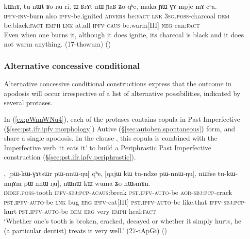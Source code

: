 \begin{exe}
\ex \label{ex:chWwGnWBlW.kWnA}
  kɯnɤ, tu-nɯt ʁo ŋu ri, ɯ-ʁrɤt nɯ ɲaʁ ʑo qʰe, maka ɲɯ-ɣɤ-mpje mɤ-cʰa. \\
  \textsc{ipfv}-\textsc{inv}-burn also \textsc{ipfv}-be.ignited \textsc{advers} be:\textsc{fact} \textsc{lnk}
\textsc{3sg}.\textsc{poss}-charcoal \textsc{dem}  be.black:\textsc{fact} \textsc{emph} \textsc{lnk} at.all \textsc{ipfv}-\textsc{caus}-be.warm[III] \textsc{neg}-can:\textsc{fact} \\
 \glt Even when one burns it, although it does ignite, its charcoal is black and it does not warm anything. (17-thowum)
()
\end{exe}
 
 \subsubsection{Alternative concessive conditional} \label{sec:alt.concessive.conditional}
Alternative concessive conditional constructions express that the outcome in apodosis will occur irrespective of a list of alternative possibilities, indicated by several protases. 


 In (\ref{ex:pWnnWNu4}), each of the protases contains copula  in Past Imperfective (§\ref{sec:pst.ifr.ipfv.morphology}) Autive (§\ref{sec:autoben.spontaneous}) form, and share a single apodosis. In the clause , this copula is combined with the Imperfective verb  `it eats it' to build a Periphrastic Past Imperfective construction (§\ref{sec:pst.ifr.ipfv.periphrastic}).

\begin{exe}
\ex  \label{ex:pWnnWNu4}
, [pɯ-kɯ-ɣɤtsɯr pɯ-nnɯ-ŋu] qʰe, [qajɯ kɯ tu-ndze pɯ-nnɯ-ŋu], nɯfse tu-kɯ-mŋɤm pɯ-nnɯ-ŋu], nɯnɯ kɯ wuma ʑo nɯsmɤn. \\
\textsc{indef}.\textsc{poss}-tooth \textsc{ipfv}-\textsc{sbj}:\textsc{pcp}-\textsc{acaus}:break \textsc{pst}.\textsc{ipfv}-\textsc{auto}-be
\textsc{aor}-\textsc{sbj}:\textsc{pcp}-crack \textsc{pst}.\textsc{ipfv}-\textsc{auto}-be \textsc{lnk}
bug \textsc{erg} \textsc{ipfv}-eat[III] \textsc{pst}.\textsc{ipfv}-\textsc{auto}-be 
like.that \textsc{ipfv}-\textsc{sbj}:\textsc{pcp}-hurt \textsc{pst}.\textsc{ipfv}-\textsc{auto}-be
\textsc{dem} \textsc{erg} very \textsc{emph} heal:\textsc{fact} \\
\glt `Whether one's tooth is broken, cracked, decayed or whether it simply hurts, he (a particular dentist) treats it very well.' (27-tApGi)
()
\end{exe}

